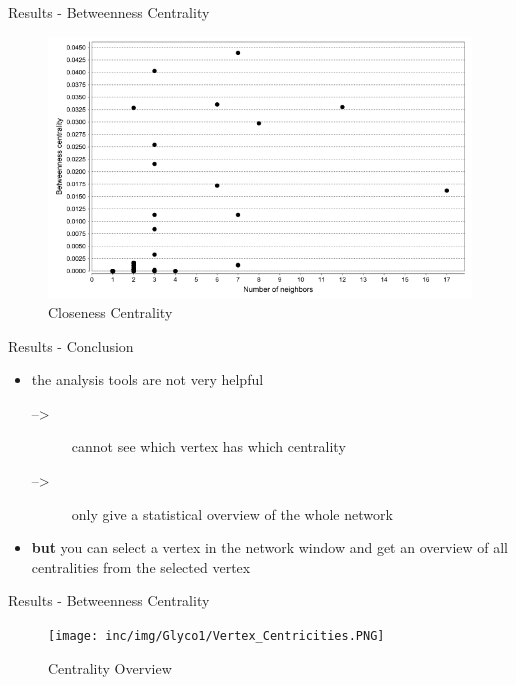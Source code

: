 \begin{frame}{Results - Betweenness Centrality}
	\begin{figure}
		\includegraphics[scale=0.4]{inc/img/Glyco1/BetweennessCentr.png}
	\caption{Closeness Centrality}
	\end{figure}
\end{frame}
\begin{frame}{Results - Conclusion}
	\begin{itemize}
		\item the analysis tools are not very helpful
		\begin{description}
			\item[-->] cannot see which vertex has which centrality
			\item[-->] only give a statistical overview of the whole network
		\end{description}
		\item \textbf{but} you can select a vertex in the network window and get an overview of all centralities from the selected vertex
	\end{itemize}
\end{frame}
\begin{frame}{Results - Betweenness Centrality}
	\begin{figure}
		\texttt{[image: inc/img/Glyco1/Vertex\_Centricities.PNG]}
	\caption{Centrality Overview}
	\end{figure}
\end{frame}